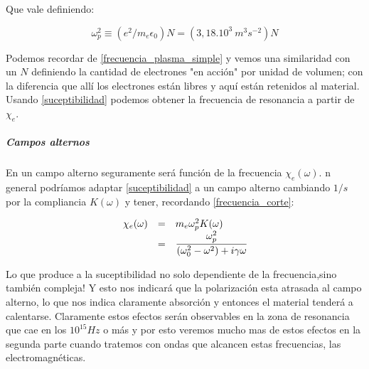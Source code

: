 \documentclass[a4paper,spanish]{article}
\numberwithin{equation}{section}
\begin{document}
Que vale definiendo:

\begin{equation}
\omega_p^2 \equiv \left(e^2 / m_e \epsilon _0\right) N = (3,18 . 10^3 \ m^3s^{-2})N
\label{frecuencia_corte}
\end{equation}

Podemos recordar de \ref{frecuencia_plasma_simple} y vemos una similaridad con un $N$ definiendo la cantidad de electrones "en acci\'on" por unidad de volumen; con la diferencia que all\'i los electrones est\'an libres y aqu\'i est\'an retenidos al material.\\
Usando \ref{suceptibilidad} podemos obtener la frecuencia de resonancia a partir de $\chi_e$.

\subparagraph{Campos alternos}

En un campo alterno seguramente ser\'a funci\'on de la frecuencia $\chi_e(\omega)$. n general podr\'iamos adaptar \ref{suceptibilidad} a un campo alterno cambiando $1 / s$ por la compliancia $K(\omega)$ y tener, recordando \ref{frecuencia_corte}:

\begin{equation}
\begin{array}{rcl}
\chi_e (\omega) & = & m_e \omega_p ^2 K(\omega) \\
& = & \cfrac{\omega_p ^2}{\left(\omega_0 ^2 - \omega ^2\right) + i\gamma \omega}
\end{array}
\label{suceptibilidad_campoalt}
\end{equation}

Lo que produce a la suceptibilidad no solo dependiente de la frecuencia,sino tambi\'en compleja! Y esto nos indicar\'a que la polarizaci\'on esta atrasada al campo alterno, lo que nos indica claramente absorci\'on y entonces el material tender\'a a calentarse. Claramente estos efectos ser\'an observables en la zona de resonancia que cae en los $10^{15} Hz$ o m\'as y por esto veremos mucho mas de estos efectos en la segunda parte cuando tratemos con ondas que alcancen estas frecuencias, las electromagn\'eticas.
\end{document}
